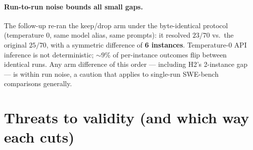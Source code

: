 \documentclass{article}
\begin{document}
\paragraph{Run-to-run noise bounds all small gaps.} The follow-up re-ran the keep/drop arm under
the byte-identical protocol (temperature 0, same model alias, same prompts): it resolved $23/70$
vs.\ the original $25/70$, with a symmetric difference of \textbf{6 instances}. Temperature-0 API
inference is not deterministic; ${\sim}9\%$ of per-instance outcomes flip between identical runs.
Any arm difference of this order --- including H2's 2-instance gap --- is within run noise, a
caution that applies to single-run SWE-bench comparisons generally.

\section{Threats to validity (and which way each cuts)}
\label{sec:threats}
\end{document}
